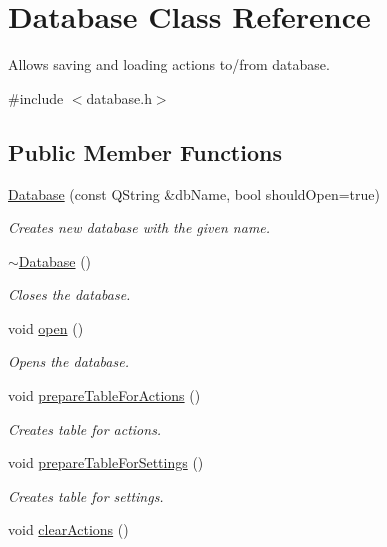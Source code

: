 \hypertarget{class_database}{\section{Database Class Reference}
\label{class_database}
}


Allows saving and loading actions to/from database.  




{\ttfamily \#include $<$database.\-h$>$}

\subsection*{Public Member Functions}
\begin{DoxyCompactItemize}
\item 
\hyperlink{class_database_a6714790c71898430c995668a06350dfe}{Database} (const Q\-String \&db\-Name, bool should\-Open=true)
\begin{DoxyCompactList}\small\item\em Creates new database with the given name. \end{DoxyCompactList}\item 
\hyperlink{class_database_a84d399a2ad58d69daab9b05330e1316d}{$\sim$\-Database} ()
\begin{DoxyCompactList}\small\item\em Closes the database. \end{DoxyCompactList}\item 
void \hyperlink{class_database_a0d0134e05c8f2dc4fcbbb2f36c02a779}{open} ()
\begin{DoxyCompactList}\small\item\em Opens the database. \end{DoxyCompactList}\item 
void \hyperlink{class_database_a7fd3f2692980d3aadd3cb609a5f958c3}{prepare\-Table\-For\-Actions} ()
\begin{DoxyCompactList}\small\item\em Creates table for actions. \end{DoxyCompactList}\item 
void \hyperlink{class_database_a6d5de878d23cd350a4e1de13ed026608}{prepare\-Table\-For\-Settings} ()
\begin{DoxyCompactList}\small\item\em Creates table for settings. \end{DoxyCompactList}\item 
void \hyperlink{class_database_a6686882d66f211ad4c92a0188e228b5a}{clear\-Actions} ()

\end{DoxyCompactItemize}
